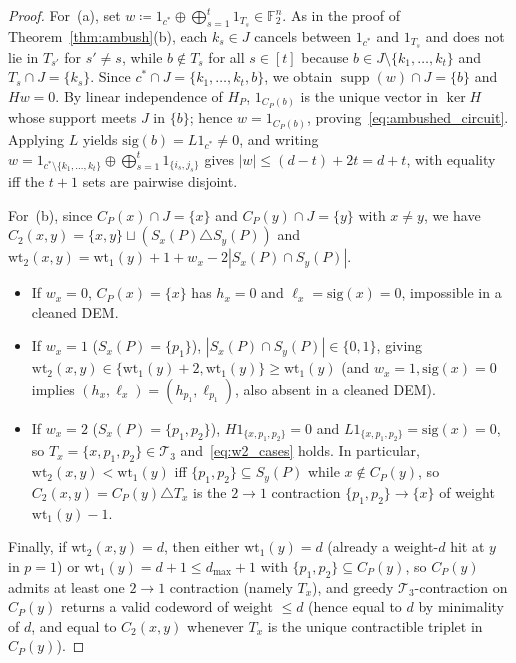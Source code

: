\documentclass[12pt]{article}
\theoremstyle{definition}
\newcommand{\Ftwo}{\mathbb{F}_2}
\DeclareMathOperator{\supp}{supp}
\newcommand{\Tc}{\mathcal{T}_3}
\begin{document}
\begin{proof}
For~(a), set $w \coloneqq 1_{c^*} \oplus \bigoplus_{s=1}^t 1_{T_s} \in \Ftwo^n$. As in the proof of
Theorem~\ref{thm:ambush}(b), each $k_s \in J$ cancels between $1_{c^*}$ and $1_{T_s}$ and does not lie in $T_{s'}$
for $s' \neq s$, while $b \notin T_s$ for all $s \in [t]$ because $b \in J \setminus \{k_1, \dots, k_t\}$ and $T_s
\cap J = \{k_s\}$. Since $c^* \cap J = \{k_1, \dots, k_t, b\}$, we obtain $\supp(w) \cap J = \{b\}$ and $H w = 0$.
By linear independence of $H_P$, $1_{C_P(b)}$ is the unique vector in $\ker H$ whose support meets $J$ in $\{b\}$;
hence $w = 1_{C_P(b)}$, proving~\eqref{eq:ambushed_circuit}. Applying $L$ yields $\mathrm{sig}(b) = L 1_{c^*} \neq
0$, and writing $w = 1_{c^* \setminus \{k_1, \dots, k_t\}} \oplus \bigoplus_{s=1}^t 1_{\{i_s, j_s\}}$ gives $|w|
\le (d - t) + 2t = d + t$, with equality iff the $t + 1$ sets are pairwise disjoint.

For~(b), since $C_P(x) \cap J = \{x\}$ and $C_P(y) \cap J = \{y\}$ with $x \neq y$, we have $C_2(x, y) = \{x, y\}
\sqcup (S_x(P) \triangle S_y(P))$ and $\mathrm{wt}_2(x, y) = \mathrm{wt}_1(y) + 1 + w_x - 2|S_x(P) \cap S_y(P)|$.
\begin{itemize}
  \item If $w_x = 0$, $C_P(x) = \{x\}$ has $h_x = 0$ and $\ell_x = \mathrm{sig}(x) = 0$, impossible in a cleaned
    DEM.
  \item If $w_x = 1$ ($S_x(P) = \{p_1\}$), $|S_x(P) \cap S_y(P)| \in \{0, 1\}$, giving $\mathrm{wt}_2(x, y) \in
    \{\mathrm{wt}_1(y) + 2, \mathrm{wt}_1(y)\} \ge \mathrm{wt}_1(y)$ (and $w_x = 1, \mathrm{sig}(x) = 0$ implies
    $(h_x, \ell_x) = (h_{p_1}, \ell_{p_1})$, also absent in a cleaned DEM).
  \item If $w_x = 2$ ($S_x(P) = \{p_1, p_2\}$), $H 1_{\{x, p_1, p_2\}} = 0$ and $L 1_{\{x, p_1, p_2\}} =
    \mathrm{sig}(x) = 0$, so $T_x = \{x, p_1, p_2\} \in \Tc$ and~\eqref{eq:w2_cases} holds. In particular,
    $\mathrm{wt}_2(x, y) < \mathrm{wt}_1(y)$ iff $\{p_1, p_2\} \subseteq S_y(P)$ while $x \notin C_P(y)$, so
    $C_2(x, y) = C_P(y) \triangle T_x$ is the $2 \to 1$ contraction $\{p_1, p_2\} \to \{x\}$ of weight
    $\mathrm{wt}_1(y) - 1$.
\end{itemize}
Finally, if $\mathrm{wt}_2(x, y) = d$, then either $\mathrm{wt}_1(y) = d$ (already a weight-$d$ hit at $y$ in $p =
1$) or $\mathrm{wt}_1(y) = d + 1 \le d_{\max} + 1$ with $\{p_1, p_2\} \subseteq C_P(y)$, so $C_P(y)$ admits at
least one $2 \to 1$ contraction (namely $T_x$), and greedy $\Tc$-contraction on $C_P(y)$ returns a valid codeword
of weight $\le d$ (hence equal to $d$ by minimality of $d$, and equal to $C_2(x, y)$ whenever $T_x$ is the unique
contractible triplet in $C_P(y)$).
\end{proof}
\end{document}
